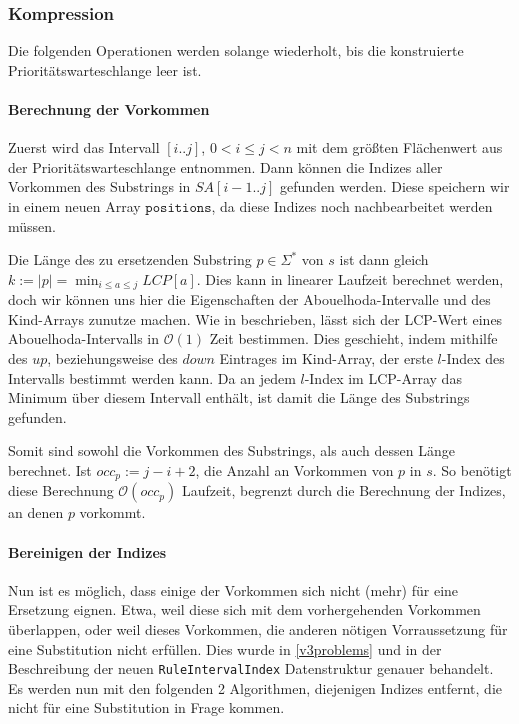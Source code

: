 \subsubsection{Kompression}

Die folgenden Operationen werden solange wiederholt, bis die konstruierte Prioritätswarteschlange leer ist. 

\paragraph{Berechnung der Vorkommen}

Zuerst wird das Intervall $[i..j]$, $0 < i \leq j < n$ mit dem größten Flächenwert aus der Prioritätswarteschlange entnommen. Dann können die Indizes aller Vorkommen des Substrings in $SA[i-1..j]$ gefunden werden. Diese speichern wir in einem neuen Array $\texttt{positions}$, da diese Indizes noch nachbearbeitet werden müssen.

Die Länge des zu ersetzenden Substring $p \in \Sigma^*$ von $s$ ist dann gleich $k := |p| = \min_{i \leq a \leq j} LCP[a]$.
Dies kann in linearer Laufzeit berechnet werden, doch wir können uns hier die Eigenschaften der Abouelhoda-Intervalle und des Kind-Arrays zunutze machen. 
Wie in \cite{abouelhoda_optimal_2002} beschrieben, lässt sich der LCP-Wert eines Abouelhoda-Intervalls in $\mathcal{O}(1)$ Zeit bestimmen. Dies geschieht, indem mithilfe des $up$, beziehungsweise des $down$ Eintrages im Kind-Array, der erste $l$-Index des Intervalls bestimmt werden kann. Da an jedem $l$-Index im LCP-Array das Minimum über diesem Intervall enthält, ist damit die Länge des Substrings gefunden.

Somit sind sowohl die Vorkommen des Substrings, als auch dessen Länge berechnet. Ist $occ_p := j - i + 2$, die Anzahl an Vorkommen von $p$ in $s$. So benötigt diese Berechnung $\mathcal{O}(occ_p)$ Laufzeit, begrenzt durch die Berechnung der Indizes, an denen $p$ vorkommt.

\paragraph{Bereinigen der Indizes}

Nun ist es möglich, dass einige der Vorkommen sich nicht (mehr) für eine Ersetzung eignen. Etwa, weil diese sich mit dem vorhergehenden Vorkommen überlappen, oder weil dieses Vorkommen, die anderen nötigen Vorraussetzung für eine Substitution nicht erfüllen. Dies wurde in \ref{v3problems} und in der Beschreibung der neuen \texttt{RuleIntervalIndex} Datenstruktur genauer behandelt. Es werden nun mit den folgenden 2 Algorithmen, diejenigen Indizes entfernt, die nicht für eine Substitution in Frage kommen.

